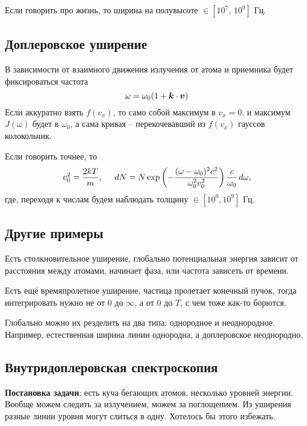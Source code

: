 Если говорить про жизнь, то ширина на полувысоте $\in [10^7, \, 10^9]$ Гц.






\subsection{Доплеровское уширение}

В зависимости от взаимного движения излучения от атома и приемника будет фиксироваться частота
\begin{equation*}
    \omega = \omega_0 (1 + \mbox{\boldmath $k$} \cdot \mbox{\boldmath $v$})
\end{equation*}
Если аккуратно взять $f(v_x)$, то само собой максимум в $v_x = 0$, и максимум $J(\omega)$ будет в $\omega_0$, а сама кривая -- перекочевавший из $f(v_x)$ гауссов колокольчик.

Если говорить точнее, то
\begin{equation*}
    v_0^2 = \frac{2kT}{m}, \hspace{5 mm}
    d N = N \exp\left(
        - \frac{(\omega-\omega_0)^2c^2}{\omega_0^2 v_0^2}
    \right) \frac{c}{\omega_0} \, d \omega,
\end{equation*}
где, переходя к числам будем наблюдать толщину $\in [10^0, 10^9]$ Гц.





\subsection{Другие примеры}

Есть столкновительное уширение, глобально потенциальная энергия зависит от расстояния между атомами, начинает фаза, или частота зависеть от времени. 

Есть ещё времяпролетное уширение, частица пролетает конечный пучок, тогда интегрировать нужно не от $0$ до $\infty$, а от $0$ до $T$, с чем тоже как-то борются.

Глобально можно их резделить на два типа: однородное и неоднородное. Например, естественная ширина линии однородна, а доплеровское неоднородно. 




\subsection{Внутридоплеровская спектроскопия}

\textbf{Постановка задачи}: есть куча бегающих атомов, несколько уровней энергии. Вообще можем следить за излучением, можем за поглощением. Из уширения разные линии уровня могут слиться в одну. Хотелось бы этого избежать.



